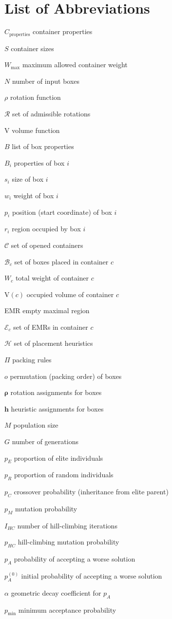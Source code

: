 \chapter*{List of Abbreviations}

$C_\text{properties}$ container properties

$S$ container sizes

$W_\text{max}$ maximum allowed container weight

$N$ number of input boxes

$\rho$ rotation function

$\mathcal{R}$ set of admissible rotations

$\mathrm{V}$ volume function

$B$ list of box properties

$B_i$ properties of box $i$

$s_i$ size of box $i$

$w_i$ weight of box $i$

$p_i$ position (start coordinate) of box $i$

$r_i$ region occupied by box $i$

$\mathcal{C}$ set of opened containers

$\mathcal{B}_c$ set of boxes placed in container $c$

$W_c$ total weight of container $c$

$\mathrm{V}(c)$ occupied volume of container $c$

EMR empty maximal region

$\mathcal{E}_c$ set of EMRs in container $c$

$\mathcal{H}$ set of placement heuristics

$\Pi$ packing rules

$o$ permutation (packing order) of boxes

$\boldsymbol{\rho}$ rotation assignments for boxes

$\mathbf{h}$ heuristic assignments for boxes

$M$ population size

$G$ number of generations

$p_E$ proportion of elite individuals

$p_R$ proportion of random individuals

$p_C$ crossover probability (inheritance from elite parent)

$p_M$ mutation probability

$I_{HC}$ number of hill-climbing iterations

$p_{HC}$ hill-climbing mutation probability

$p_A$ probability of accepting a worse solution

$p_A^{(0)}$ initial probability of accepting a worse solution

$\alpha$ geometric decay coefficient for $p_A$

$p_{\min}$ minimum acceptance probability
 
